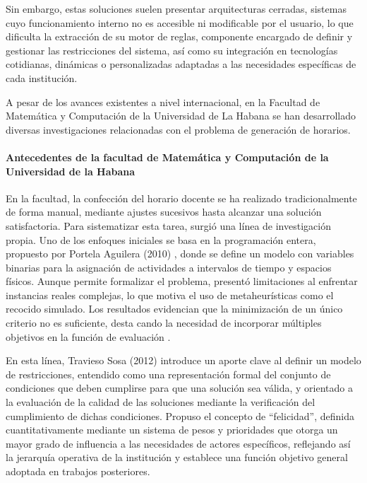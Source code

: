 \documentclass{article}
\begin{document}
Sin embargo, estas soluciones suelen presentar arquitecturas cerradas, sistemas cuyo funcionamiento interno no es accesible ni modificable por el usuario, lo que dificulta la extracción de su motor de reglas, componente encargado de definir y gestionar las restricciones del sistema, así como su integración en tecnologías cotidianas, dinámicas o personalizadas adaptadas a las necesidades específicas de cada institución.

A pesar de los avances existentes a nivel internacional, en la Facultad de Matemática y Computación de la Universidad de La Habana se han desarrollado diversas investigaciones relacionadas con el problema de generación de horarios.

\paragraph{Antecedentes de la facultad de Matemática y Computación de la Universidad de la Habana}
En la facultad, la confección del horario docente se ha realizado tradicionalmente de forma manual, mediante ajustes sucesivos hasta alcanzar una solución satisfactoria. Para sistematizar esta tarea, surgió una línea de investigación propia. Uno de los enfoques iniciales se basa en la programación entera, propuesto por Portela Aguilera (2010) \cite{portela2010}, donde se define un modelo con variables binarias para la asignación de actividades a intervalos de tiempo y espacios físicos. Aunque permite formalizar el problema, presentó limitaciones al enfrentar instancias reales complejas, lo que motiva el uso de metaheurísticas como el recocido simulado. Los resultados evidencian que la minimización de un único criterio no es suficiente, desta
cando la necesidad de incorporar múltiples objetivos en la función de evaluación  \cite{portela2010}.

En esta línea, Travieso Sosa (2012) \cite{travieso2012} introduce un aporte clave al definir un modelo de restricciones, entendido como una representación formal del conjunto de condiciones que deben cumplirse para que una solución sea válida, y orientado a la evaluación de la calidad de las soluciones mediante la verificación del cumplimiento de dichas condiciones. Propuso el concepto de ``felicidad'', definida cuantitativamente mediante un sistema de pesos y prioridades que otorga un mayor grado de influencia a las necesidades de actores específicos, reflejando así la jerarquía operativa de la institución y establece una función objetivo general adoptada en trabajos posteriores.
\end{document}
